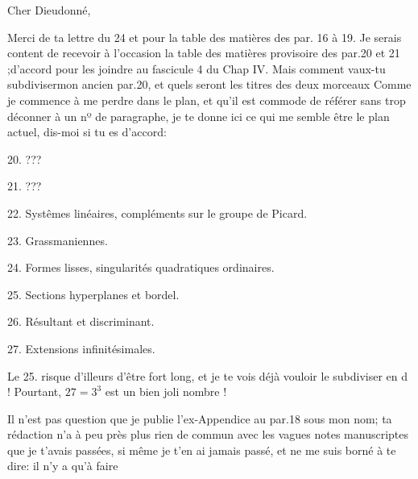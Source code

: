 

Cher Dieudonné,

Merci de ta lettre du 24  et pour la table des matières des par.
16 à 19.  Je serais content de recevoir à l'occasion la table des
matières provisoire des par.20 et 21 ;d'accord pour les joindre au
fascicule 4 du Chap IV. Mais comment vaux-tu  subdivisermon ancien par.20, et
quels seront les titres des deux morceaux  Comme je commence à me
perdre dans le plan, et qu'il est  commode de  référer
sans trop déconner à un nº de paragraphe, je te donne ici ce qui me
semble être le plan actuel, dis-moi si tu es d'accord:

20.  ???

21.  ???

22.  Systêmes linéaires, compléments sur le groupe de Picard.

23.  Grassmaniennes.

24.  Formes lisses, singularités quadratiques ordinaires.

25.  Sections hyperplanes et bordel.

26.  Résultant et discriminant.

27.  Extensions infinitésimales.

Le 25.  risque d'illeurs d'être fort long, et je te vois déjà
vouloir le subdiviser en d !  Pourtant, $27=3^3$ est un bien joli
nombre !

Il n'est pas question que je publie l'ex-Appendice au par.18
sous mon nom; ta rédaction n'a à peu près plus rien de commun avec
les vagues notes manuscriptes que je t'avais passées, si même je t'en
ai jamais passé, et ne me suis borné à te dire: il n'y a qu'à faire

